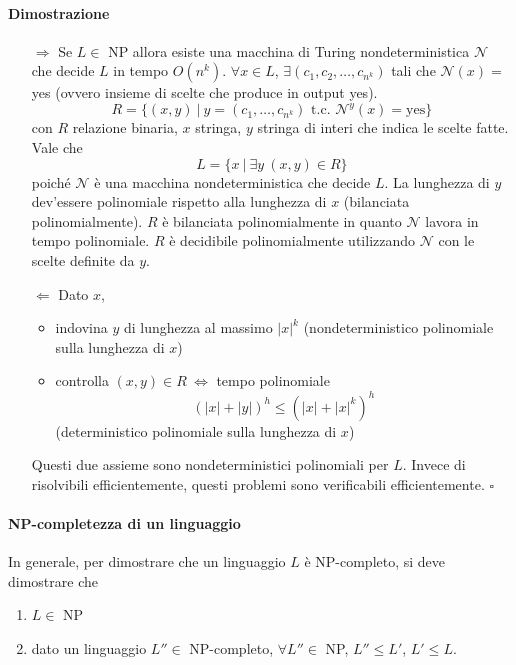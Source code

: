 \paragraph{Dimostrazione} 
\begin{itemize}
    \item[$\Rightarrow$] Se $L\in$ NP allora esiste una macchina di Turing nondeterministica $\mathcal{N}$ che decide $L$ in tempo $O(n^k)$. $\forall x\in L$, $\exists(c_1,c_2,\dots,c_{n^k})$ tali che $\mathcal{N}(x)=$ yes (ovvero insieme di scelte che produce in out\-put yes).
    $$
        R = \{ (x,y) ~|~ y=(c_1,\dots,c_{n^k}) \text{ t.c.~} \mathcal{N}^y(x)=\text{yes} \}
    $$
    con $R$ relazione binaria, $x$ stringa, $y$ stringa di interi che indica le scelte fatte. Vale che 
    $$
        L = \{ x ~|~ \exists y~(x,y)\in R \}
    $$
    poiché $\mathcal{N}$ è una macchina nondeterministica che decide $L$. La lunghezza di $y$ dev'essere polinomiale rispetto alla lunghezza di $x$ (bilanciata polinomialmente). $R$ è bilanciata polinomialmente in quanto $\mathcal{N}$ lavora in tempo polinomiale. $R$ è decidibile polinomialmente utilizzando $\mathcal{N}$ con le scelte definite da $y$.
    \item[$\Leftarrow$] Dato $x$,
    \begin{itemize}
        \item indovina $y$ di lunghezza al massimo $|x|^k$ (nondeterministico polinomiale sulla lunghezza di $x$)
        \item controlla $(x,y)\in R ~\Leftrightarrow$ tempo polinomiale 
        $$
            (|x|+|y|)^h \leq (|x| + |x|^k)^h
        $$
        (deterministico polinomiale sulla lunghezza di $x$)
    \end{itemize}
    Questi due assieme sono nondeterministici polinomiali per $L$. Invece di risolvibili efficientemente, questi problemi sono verificabili efficientemente. \hfill$\square$ 
\end{itemize}

\paragraph{NP-completezza di un linguaggio} In generale, per dimostrare che un linguaggio $L$ è NP-completo, si deve dimostrare che 
\begin{enumerate}
    \item $L\in$ NP
    \item dato un linguaggio $L''\in$ NP-completo, $\forall L''\in$ NP, $L''\leq L'$, $L'\leq L$. 
\end{enumerate}


